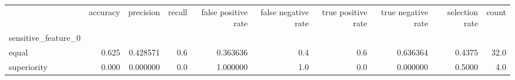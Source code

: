\begin{tabular}{lrrrrrrrrr}
\toprule
{} &  accuracy &  precision &  recall &  false positive rate &  false negative rate &  true positive rate &  true negative rate &  selection rate &  count \\
sensitive\_feature\_0 &           &            &         &                      &                      &                     &                     &                 &        \\
\midrule
equal               &     0.625 &   0.428571 &     0.6 &             0.363636 &                  0.4 &                 0.6 &            0.636364 &          0.4375 &   32.0 \\
superiority         &     0.000 &   0.000000 &     0.0 &             1.000000 &                  1.0 &                 0.0 &            0.000000 &          0.5000 &    4.0 \\
\bottomrule
\end{tabular}

